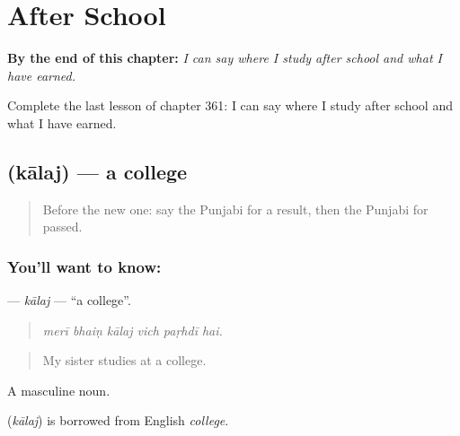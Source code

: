 
\chapter{After School}
\label{ch:pa-a2-after-school}

\begin{chapteropening}
\textbf{By the end of this chapter:} \emph{I can say where I study after school and what I have earned.}

Complete the last lesson of chapter 361: I can say where I study after school and what I have earned.
\end{chapteropening}

\section[\texorpdfstring{\pa{ਕਾਲਜ} (kālaj)}{ਕਾਲਜ (kālaj)}]{ (kālaj) — a college}

\label{lesson:PA-C361-kalaj}



\begin{quote}
Before the new one: say the Punjabi for a result, then the Punjabi for passed.
\end{quote}

\subsection*{You'll want to know: }
\textbf{} — \emph{kālaj} — \textquotedblleft{}a college\textquotedblright{}.

\begin{quote}
     
\end{quote}

\begin{quote}
\emph{merī bhaiṇ kālaj vich paṛhdī hai.}
\end{quote}

\begin{quote}
My sister studies at a college.
\end{quote}

A masculine noun.

\begin{cousinweb}
\textbf{} (\emph{kālaj}) is borrowed from English \emph{college}.
\end{cousinweb}

